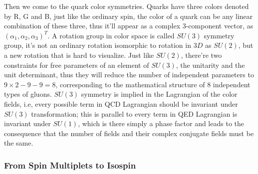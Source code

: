 \documentclass{article}
\renewcommand{\1}{\left}
\renewcommand{\2}{\right}
\newcommand{\al}{\alpha}
\begin{document}
Then we come to the quark color symmetries. Quarks have three colors denoted by R, G and B, just like the ordinary spin, the color of a quark can be any linear combination of these three, thus it'll appear as a complex $3$-component vector, as $(\al_1,\al_2,\al_3)^T$. A rotation group in color space is called $SU(3)$ symmetry group, it's not an ordinary rotation isomorphic to rotation in $3D$ as $SU(2)$, but a new rotation that is hard to visualize. Just like $SU(2)$, there're two constraints for free parameters of an element of $SU(3)$, the unitarity and the unit determinant, thus they will reduce the number of independent parameters to $9\times 2-9-9=8$, corresponding to the mathematical structure of $8$ independent types of gluons. $SU(3)$ symmetry is implied in the Lagrangian of the color fields, i.e, every possible term in QCD Lagrangian should be invariant under $SU(3)$ transformation; this is parallel to every term in QED Lagrangian is invariant under $SU(1)$, which is there simply a phase factor and leads to the consequence that the number of fields and their complex conjugate fields must be the same.

\subsubsection{From Spin Multiplets to Isospin}
\end{document}
